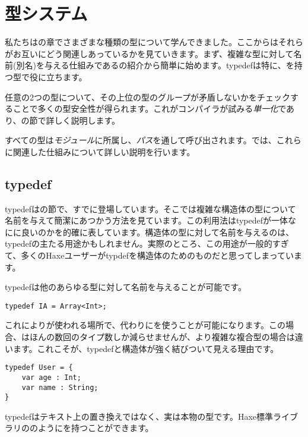 \chapter{型システム}
\label{type-system}

私たちはの章でさまざまな種類の型について学んできました。ここからはそれらがお互いにどう関連しあっているかを見ていきます。まず、複雑な型に対して名前(別名)を与える仕組みであるの紹介から簡単に始めます。typedefは特に、を持つ型で役に立ちます。

任意の2つの型について、その上位の型のグループが矛盾しないかをチェックすることで多くの型安全性が得られます。これがコンパイラが試みる\emph{単一化}であり、の節で詳しく説明します。

すべての型は\emph{モジュール}に所属し、\emph{パス}を通して呼び出されます。では、これらに関連した仕組みについて詳しい説明を行います。

\section{typedef}
\label{type-system-typedef}

typedefはの節で、すでに登場しています。そこでは複雑な構造体の型について名前を与えて簡潔にあつかう方法を見ています。この利用法はtypedefが一体なにに良いのかを的確に表しています。構造体の型に対して名前を与えるのは、typedefの主たる用途かもしれません。実際のところ、この用途が一般的すぎて、多くのHaxeユーザーがtypdefを構造体のためのものだと思ってしまっています。

typedefは他のあらゆる型に対して名前を与えることが可能です。

\begin{lstlisting}
typedef IA = Array<Int>;
\end{lstlisting}

これによりが使われる場所で、代わりにを使うことが可能になります。この場合、はほんの数回のタイプ数しか減らせませんが、より複雑な複合型の場合は違います。これこそが、typedefと構造体が強く結びついて見える理由です。

\begin{lstlisting}
typedef User = {
    var age : Int;
    var name : String;
}
\end{lstlisting}

typedefはテキスト上の置き換えではなく、実は本物の型です。Haxe標準ライブラリののようにを持つことができます。

